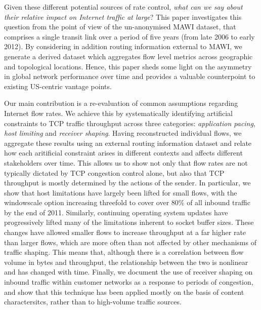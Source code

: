 Given these different potential sources of rate control, \emph{what can we say about their relative impact on Internet traffic at large}?
This paper investigates this question from the point of view of the un-anonymised MAWI dataset, that comprises a single transit link over a period of five years (from late 2006 to early 2012). By considering in addition routing information external to MAWI, we generate a derived dataset which aggregates flow level metrics across geographic and topological locations. Hence, this paper sheds some light on the asymmetry in global network performance over time and provides a valuable counterpoint to existing US-centric vantage points.

Our main contribution is a re-evaluation of common assumptions regarding Internet flow rates. We achieve this by systematically identifying artificial constraints to TCP traffic throughput across three categories: \emph{application pacing}, \emph{host limiting} and \emph{receiver shaping}. 
Having reconstructed individual flows, we aggregate these results using an external routing information dataset and relate how each aritificial constraint arises in different contexts and affects different stakeholders over time.  This allows us to show not only that flow rates are not typically dictated by TCP congestion control alone, but also that TCP throughput is mostly determined by the actions of the sender. In particular, we show that host limitations have largely been lifted for small flows, with the windowscale option increasing threefold to cover over 80\% of all inbound traffic by the end of 2011. 
Similarly, continuing operating system updates have progressively lifted many of the limitations inherent to socket buffer sizes. These changes have allowed smaller flows to increase throughput at a far higher rate than larger flows, which are more often than not affected by other mechanisms of traffic shaping.
This means that, although there is a correlation between flow volume in bytes and throughput, the relationship between the two is nonlinear and has changed with time.
Finally, we document the use of receiver shaping on inbound traffic within customer networks as a response to periods of congestion, and show that this technique has been applied mostly on the basis of content charactersitcs, rather than to high-volume traffic sources. 


% 
%


